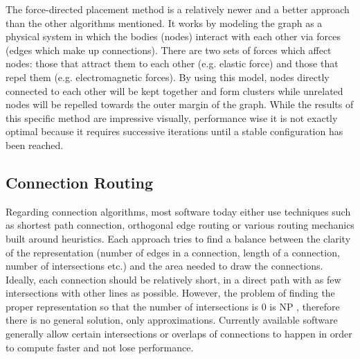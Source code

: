 The force-directed placement method is a relatively newer and a better approach than the other algorithms mentioned.
It works by modeling the graph as a physical system in which the bodies (nodes) interact with each other via
forces (edges which make up connections). There are two sets of forces which affect nodes: those that attract
them to each other (e.g. elastic force) and those that repel them (e.g. electromagnetic forces). By using
this model, nodes directly connected to each other will be kept together and form clusters while unrelated
nodes will be repelled towards the outer margin of the graph. While the results of this specific method are
impressive visually, performance wise it is not exactly optimal because it requires successive iterations
until a stable configuration has been reached.

\subsection{Connection Routing}

Regarding connection algorithms, most software today either use techniques such as shortest path connection, orthogonal edge routing or various routing mechanics built around heuristics. Each approach tries to find a 
balance between the clarity of the representation (number of edges in a connection, length of a connection, 
number of intersections etc.) and the area needed to draw the connections. Ideally, each connection should be 
relatively short, in a direct path with as few intersections with other lines as possible. However, the problem
of finding the proper representation so that the number of intersections is 0 is NP , therefore there is no
general solution, only approximations. Currently available software generally allow certain intersections or 
overlaps of connections to happen in order to compute faster and not lose performance.
